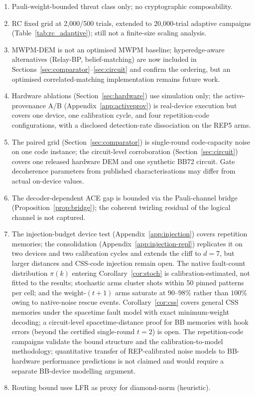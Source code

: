 \documentclass[11pt,a4paper]{article}
\begin{document}
\begin{enumerate}[leftmargin=1.4em]
  \item Pauli-weight-bounded threat class only; no cryptographic composability.
  \item RC fixed grid at 2{,}000/500 trials, extended to
    20{,}000-trial adaptive campaigns
    (Table~\ref{tab:rc_adaptive}); still not a finite-size scaling
    analysis.
  \item MWPM-DEM is not an optimised MWPM baseline; hyperedge-aware
    alternatives (Relay-BP, belief-matching) are now included in
    Sections~\ref{sec:comparator}--\ref{sec:circuit} and confirm the
    ordering, but an optimised correlated-matching implementation remains
    future work.
  \item Hardware ablations (Section~\ref{sec:hardware}) use simulation only;
    the active-provenance A/B (Appendix~\ref{app:activeprov}) is real-device
    execution but covers one device, one calibration cycle, and four
    repetition-code configurations, with a disclosed detection-rate
    dissociation on the REP5 arms.
  \item The paired grid (Section~\ref{sec:comparator}) is single-round
    code-capacity noise on one code instance; the circuit-level
    corroboration (Section~\ref{sec:circuit}) covers one released hardware
    DEM and one synthetic BB72 circuit. Gate decoherence parameters from
    published characterisations may differ from actual on-device values.
  \item The decoder-dependent ACE gap is bounded via the Pauli-channel
    bridge (Proposition~\ref{prop:bridge}); the coherent twirling
    residual of the logical channel is not captured.
  \item The injection-budget device test (Appendix~\ref{app:injection})
    covers repetition memories; the consolidation
    (Appendix~\ref{app:injection-repl}) replicates it on two devices and
    two calibration cycles and extends the cliff to $d{=}7$, but larger
    distances and CSS-code injection remain open. The native fault-count
    distribution $\pi(k)$ entering Corollary~\ref{cor:stoch} is
    calibration-estimated, not fitted to the results; stochastic arms
    cluster shots within 50 pinned patterns per cell; and the
    weight-$(t{+}1)$ arms saturate at $90$--$98\%$ rather than $100\%$
    owing to native-noise rescue events. Corollary~\ref{cor:css} covers general CSS memories under
    the spacetime fault model with exact minimum-weight decoding; a
    circuit-level spacetime-distance proof for BB memories with hook
    errors (beyond the certified single-round $t=2$) is open. The
    repetition-code campaigns
    validate the bound structure and the calibration-to-model
    methodology; quantitative transfer of REP-calibrated noise models
    to BB-hardware performance predictions is not claimed and would
    require a separate BB-device modelling argument.
  \item Routing bound uses LFR as proxy for diamond-norm (heuristic).
\end{enumerate}
\end{document}
